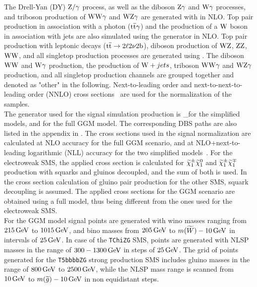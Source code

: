 The Drell-Yan (DY) $\mathrm{Z}/\gamma$ process, as well as the diboson $\mathrm{Z}\gamma$ and $\mathrm{W}\gamma$ processes, and triboson production of $\mathrm{W}\mathrm{W}\gamma$ and $\mathrm{W}\mathrm{Z}\gamma$ are generated with \MADANDMC in NLO. Top pair production in association with a photon (${\mathrm{t}\overline{\mathrm{t}}}\gamma$) and the production of a $\mathrm{W}$ boson in association with jets are also simulated using the \MADANDMC generator in NLO. Top pair production with leptonic decays (${\mathrm{t}\overline{\mathrm{t}}}\to 2\ell 2\nu 2\mathrm{b}$), diboson production of $\mathrm{W}\mathrm{Z}$, $\mathrm{Z}\mathrm{Z}$, $\mathrm{W}\mathrm{W}$, and all singletop production processes are generated using \POWHEG.
The diboson $\mathrm{W}\mathrm{W}$ and $\mathrm{W}\gamma$ production, the production of $\mathrm{W}+jets$, triboson $\mathrm{W}\mathrm{W}\gamma$ and $\mathrm{W}\mathrm{Z}\gamma$ production, and all singletop production channels are grouped together and denoted as "other" in the following.
Next-to-leading order and next-to-next-to-leading order (NNLO) cross sections~\cite{xsec1,xsec2,xsec3,xsec4,xsec5,xsec6,xsec7,xsec8,xsec9} are used for the normalization of the samples.\\
The generator used for the signal simulation production is \MADGRAPH\_\MCATNLO for the simplified models, and  for the full GGM model. The corresponding DBS paths are also listed in the appendix in .
The cross sections used in the signal normalization are calculated at NLO accuracy for the full GGM scenario, and at NLO+next-to-leading logarithmic (NLL) accuracy for the two simplified models~\cite{sxsec1,sxsec2,sxsec3,sxsec4,sxsec5,sxsec6,sxsec7,sxsec8,sxsec9}.
For the electroweak SMS, the applied cross section is calculated for $\widetilde{\chi}^\pm_{1}\widetilde{\chi}^{0}_{1}$ and $\widetilde{\chi}^\pm_{1}\widetilde{\chi}^\mp_{1}$ production with squarks and gluinos decoupled, and the sum of both is used. In the cross section calculation of gluino pair production for the other SMS, squark decoupling is assumed. The applied cross sections for the GGM scenario are obtained using a full model, thus being different from the ones used for the electroweak SMS.\\
For the GGM model signal points are generated with wino masses ranging from $215\,\text{Ge\hspace{-.08em}V}$ to $1015\,\text{Ge\hspace{-.08em}V}$, and bino masses from $205\,\text{Ge\hspace{-.08em}V}$ to $m(\widetilde{W})-10\,\text{Ge\hspace{-.08em}V}$ in intervals of $25\,\text{Ge\hspace{-.08em}V}$.
In case of the \texttt{TChiZG} SMS, points are generated with NLSP masses in the range of $300-1300\,\text{Ge\hspace{-.08em}V}$ in steps of $25\,\text{Ge\hspace{-.08em}V}$. The grid of points generated for the \texttt{T5bbbbZG} strong production SMS includes gluino masses in the range of $800\,\text{Ge\hspace{-.08em}V}$ to $2500\,\text{Ge\hspace{-.08em}V}$, while the NLSP mass range is scanned from $10\,\text{Ge\hspace{-.08em}V}$ to $m(\widetilde{g})-10\,\text{Ge\hspace{-.08em}V}$ in non equidistant steps.\\

